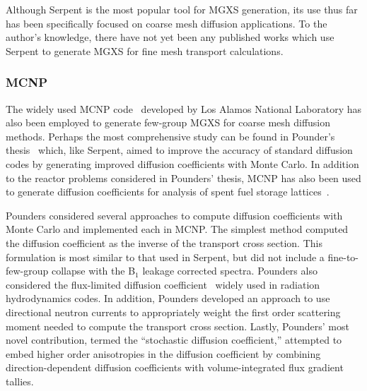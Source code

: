 Although Serpent is the most popular tool for \ac{MGXS} generation, its use thus far has been specifically focused on coarse mesh diffusion applications. To the author's knowledge, there have not yet been any published works which use Serpent to generate \ac{MGXS} for fine mesh transport calculations.


\subsubsection{MCNP}
\label{subsec:chap3-lit-review-diffusion-mcnp}

The widely used MCNP code~\cite{mcnpx2003manual} developed by Los Alamos National Laboratory has also been employed to generate few-group \ac{MGXS} for coarse mesh diffusion methods. Perhaps the most comprehensive study can be found in Pounder's thesis~\cite{pounders2006stochastically} which, like Serpent, aimed to improve the accuracy of standard diffusion codes by generating improved diffusion coefficients with Monte Carlo. In addition to the reactor problems considered in Pounders' thesis, MCNP has also been used to generate diffusion coefficients for analysis of spent fuel storage lattices~\cite{ilas2003monte}.

Pounders considered several approaches to compute diffusion coefficients with Monte Carlo and implemented each in MCNP. The simplest method computed the diffusion coefficient as the inverse of the transport cross section. This formulation is most similar to that used in Serpent, but did not include a fine-to-few-group collapse with the B$_{1}$ leakage corrected spectra. Pounders also considered the flux-limited diffusion coefficient~\cite{pomraning1984flux} widely used in radiation hydrodynamics codes. In addition, Pounders developed an approach to use directional neutron currents to appropriately weight the first order scattering moment needed to compute the transport cross section. Lastly, Pounders' most novel contribution, termed the ``stochastic diffusion coefficient,'' attempted to embed higher order anisotropies in the diffusion coefficient by combining direction-dependent diffusion coefficients with volume-integrated flux gradient tallies.

